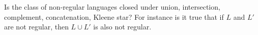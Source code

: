 Is the class of non-regular languages closed under union,
intersection, complement, concatenation, Kleene star?
For instance is it true that if $L$ and $L'$ are not regular,
then $L \cup L'$ is also not regular.

